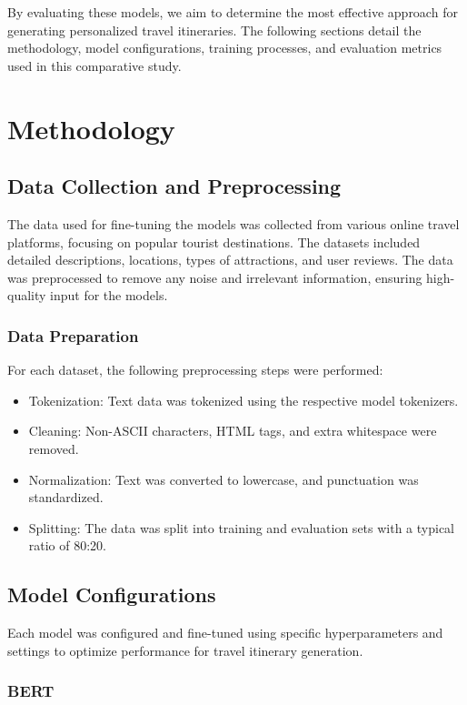 \documentclass[conference]{IEEEtran}
\begin{document}
By evaluating these models, we aim to determine the most effective approach for generating personalized travel itineraries. The following sections detail the methodology, model configurations, training processes, and evaluation metrics used in this comparative study.


\section{Methodology}

\subsection{Data Collection and Preprocessing}

The data used for fine-tuning the models was collected from various online travel platforms, focusing on popular tourist destinations. The datasets included detailed descriptions, locations, types of attractions, and user reviews. The data was preprocessed to remove any noise and irrelevant information, ensuring high-quality input for the models.

\subsubsection{Data Preparation}

For each dataset, the following preprocessing steps were performed:
\begin{itemize}
    \item Tokenization: Text data was tokenized using the respective model tokenizers.
    \item Cleaning: Non-ASCII characters, HTML tags, and extra whitespace were removed.
    \item Normalization: Text was converted to lowercase, and punctuation was standardized.
    \item Splitting: The data was split into training and evaluation sets with a typical ratio of 80:20.
\end{itemize}

\subsection{Model Configurations}

Each model was configured and fine-tuned using specific hyperparameters and settings to optimize performance for travel itinerary generation.

\subsubsection{BERT}
\end{document}
